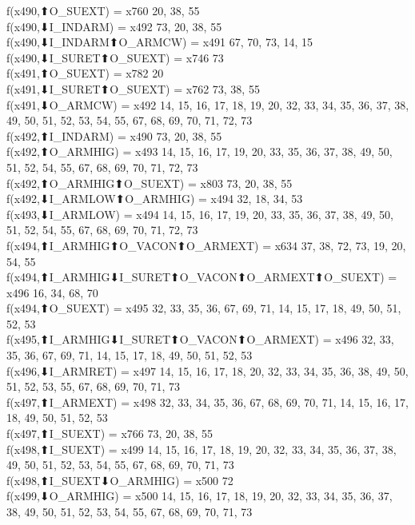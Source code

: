f(x490,⬆O_SUEXT) = x760 {20, 38, 55} \\
f(x490,⬇I_INDARM) = x492 {73, 20, 38, 55} \\
f(x490,⬇I_INDARM⬆O_ARMCW) = x491 {67, 70, 73, 14, 15} \\
f(x490,⬇I_SURET⬆O_SUEXT) = x746 {73} \\
f(x491,⬆O_SUEXT) = x782 {20} \\
f(x491,⬇I_SURET⬆O_SUEXT) = x762 {73, 38, 55} \\
f(x491,⬇O_ARMCW) = x492 {14, 15, 16, 17, 18, 19, 20, 32, 33, 34, 35, 36, 37, 38, 49, 50, 51, 52, 53, 54, 55, 67, 68, 69, 70, 71, 72, 73} \\
f(x492,⬆I_INDARM) = x490 {73, 20, 38, 55} \\
f(x492,⬆O_ARMHIG) = x493 {14, 15, 16, 17, 19, 20, 33, 35, 36, 37, 38, 49, 50, 51, 52, 54, 55, 67, 68, 69, 70, 71, 72, 73} \\
f(x492,⬆O_ARMHIG⬆O_SUEXT) = x803 {73, 20, 38, 55} \\
f(x492,⬇I_ARMLOW⬆O_ARMHIG) = x494 {32, 18, 34, 53} \\
f(x493,⬇I_ARMLOW) = x494 {14, 15, 16, 17, 19, 20, 33, 35, 36, 37, 38, 49, 50, 51, 52, 54, 55, 67, 68, 69, 70, 71, 72, 73} \\
f(x494,⬆I_ARMHIG⬆O_VACON⬆O_ARMEXT) = x634 {37, 38, 72, 73, 19, 20, 54, 55} \\
f(x494,⬆I_ARMHIG⬇I_SURET⬆O_VACON⬆O_ARMEXT⬆O_SUEXT) = x496 {16, 34, 68, 70} \\
f(x494,⬆O_SUEXT) = x495 {32, 33, 35, 36, 67, 69, 71, 14, 15, 17, 18, 49, 50, 51, 52, 53} \\
f(x495,⬆I_ARMHIG⬇I_SURET⬆O_VACON⬆O_ARMEXT) = x496 {32, 33, 35, 36, 67, 69, 71, 14, 15, 17, 18, 49, 50, 51, 52, 53} \\
f(x496,⬇I_ARMRET) = x497 {14, 15, 16, 17, 18, 20, 32, 33, 34, 35, 36, 38, 49, 50, 51, 52, 53, 55, 67, 68, 69, 70, 71, 73} \\
f(x497,⬆I_ARMEXT) = x498 {32, 33, 34, 35, 36, 67, 68, 69, 70, 71, 14, 15, 16, 17, 18, 49, 50, 51, 52, 53} \\
f(x497,⬆I_SUEXT) = x766 {73, 20, 38, 55} \\
f(x498,⬆I_SUEXT) = x499 {14, 15, 16, 17, 18, 19, 20, 32, 33, 34, 35, 36, 37, 38, 49, 50, 51, 52, 53, 54, 55, 67, 68, 69, 70, 71, 73} \\
f(x498,⬆I_SUEXT⬇O_ARMHIG) = x500 {72} \\
f(x499,⬇O_ARMHIG) = x500 {14, 15, 16, 17, 18, 19, 20, 32, 33, 34, 35, 36, 37, 38, 49, 50, 51, 52, 53, 54, 55, 67, 68, 69, 70, 71, 73} \\
